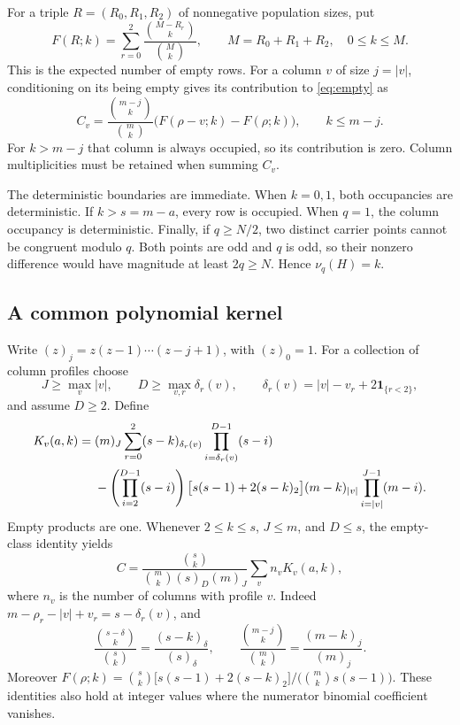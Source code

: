 \documentclass[11pt,a4paper]{article}
\theoremstyle{remark}
\newcommand{\one}{\mathbf 1}
\numberwithin{equation}{section}
\begin{document}
For a triple \(R=(R_0,R_1,R_2)\) of nonnegative population sizes, put
\begin{equation}\label{eq:F}
 F(R;k)=\sum_{r=0}^2\frac{\binom{M-R_r}k}{\binom Mk},
 \qquad M=R_0+R_1+R_2,\quad 0\le k\le M.
\end{equation}
This is the expected number of empty rows.
For a column \(v\) of size \(j=|v|\), conditioning on its being empty
gives its contribution to \eqref{eq:empty} as
\begin{equation}\label{eq:conditional}
 C_v=\frac{\binom{m-j}k}{\binom mk}
       \bigl(F(\rho-v;k)-F(\rho;k)\bigr),\qquad k\le m-j.
\end{equation}
For \(k>m-j\) that column is always occupied, so its contribution is zero.
Column multiplicities must be retained when summing \(C_v\).

The deterministic boundaries are immediate. When \(k=0,1\), both
occupancies are deterministic. If \(k>s=m-a\), every row is occupied.
When \(q=1\), the column occupancy is deterministic. Finally, if
\(q\ge N/2\), two distinct carrier points cannot be congruent modulo \(q\).
Both points are odd and \(q\) is odd, so their nonzero difference would
have magnitude at least \(2q\ge N\). Hence \(\nu_q(H)=k\).

\subsection{A common polynomial kernel}\label{sec:kernel}
Write \((z)_j=z(z-1)\cdots(z-j+1)\), with \((z)_0=1\).
For a collection of column profiles choose
\[
 J\ge\max_v|v|,\qquad
 D\ge\max_{v,r}\delta_r(v),\qquad
 \delta_r(v)=|v|-v_r+2\one_{\{r<2\}},
\]
and assume \(D\ge2\). Define
\begin{align}
 K_v(a,k)={}&(m)_J\sum_{r=0}^2(s-k)_{\delta_r(v)}
                     \prod_{i=\delta_r(v)}^{D-1}(s-i) \notag\\
 &-\left(\prod_{i=2}^{D-1}(s-i)\right)
       \bigl[s(s-1)+2(s-k)_2\bigr](m-k)_{|v|}
                     \prod_{i=|v|}^{J-1}(m-i).
 \label{eq:kernel}
\end{align}
Empty products are one. Whenever \(2\le k\le s\), \(J\le m\),
and \(D\le s\), the empty-class identity yields
\begin{equation}\label{eq:kernelcov}
 C=\frac{\binom sk}{\binom mk(s)_D(m)_J}\sum_v n_v K_v(a,k),
\end{equation}
where \(n_v\) is the number of columns with profile \(v\).
Indeed \(m-\rho_r-|v|+v_r=s-\delta_r(v)\), and
\[
 \frac{\binom{s-\delta}k}{\binom sk}
       =\frac{(s-k)_\delta}{(s)_\delta},\qquad
 \frac{\binom{m-j}k}{\binom mk}=\frac{(m-k)_j}{(m)_j}.
\]
Moreover
\(F(\rho;k)=\binom sk\bigl[s(s-1)+2(s-k)_2\bigr]/
 \bigl(\binom mk s(s-1)\bigr)\).
These identities also hold at integer values where the numerator
binomial coefficient vanishes.
\end{document}
